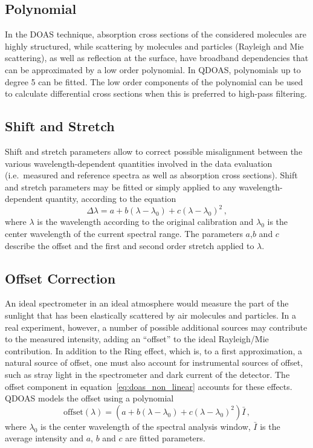 \subsection{Polynomial}\label{sec:polynomial}
In the DOAS technique, absorption cross sections of the considered
mole\-cules are highly structured, while scattering by molecules and
particles (Rayleigh and Mie scattering), as well as reflection at the
surface, have broadband dependencies that can be approximated by a low
order polynomial. In QDOAS, polynomials up to degree 5 can be
fitted. The low order components of the polynomial can be used to
calculate differential cross sections when this is preferred to
high-pass filtering.

\subsection{Shift and Stretch}\label{sec:shift-stretch}
Shift and stretch parameters allow to correct possible misalignment
between the various wavelength-dependent quantities involved in the
data evaluation (i.e.\ measured and reference spectra as well as
absorption cross sections).  Shift and stretch parameters may be
fitted or simply applied to any wavelength-dependent quantity,
according to the equation
\begin{equation}
  \label{eq:shift_stretch}
  \Delta\lambda = a + b(\lambda-\lambda_0) + c(\lambda-\lambda_0)^2\, ,
\end{equation}
where $\lambda$ is the wavelength according to the original
calibration and $\lambda_0$ is the center wavelength of the current
spectral range.  The parameters $a$,$b$ and $c$ describe the offset
and the first and second order stretch applied to $\lambda$.

\subsection{Offset Correction}\label{sec:offset-correction}
An ideal spectrometer in an ideal atmosphere would measure the part of
the sunlight that has been elastically scattered by air molecules and
particles.  In a real experiment, however, a number of possible
additional sources may contribute to the measured intensity, adding an
“offset” to the ideal Rayleigh/Mie contribution.  In addition to the
Ring effect, which is, to a first approximation, a natural source of
offset, one must also account for instrumental sources of offset, such
as stray light in the spectrometer and dark current of the detector.
The offset component in equation~\eqref{eq:doas_non_linear} accounts
for these effects.  QDOAS models the offset using a polynomial
\begin{equation}
  \label{eq:offset}
  \mathrm{offset}(\lambda) = (a + b(\lambda-\lambda_0) + c(\lambda-\lambda_0)^2) \bar{I}\, ,
\end{equation}
where $\lambda_0$ is the center wavelength of the spectral analysis
window, $\bar{I}$ is the average intensity and $a$, $b$ and $c$ are
fitted parameters.

